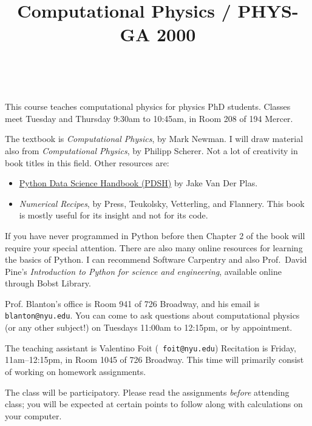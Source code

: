 \documentclass[11pt, preprint]{aastex}
\begin{document}
\title{\bf Computational Physics / PHYS-GA 2000}
~
~



\noindent This course teaches computational physics for physics PhD
students. Classes meet Tuesday and Thursday 9:30am to 10:45am, in Room
208 of 194 Mercer.

\noindent The textbook is {\it Computational Physics}, by Mark
Newman. I will draw material also from {\it Computational Physics}, by
Philipp Scherer. Not a lot of creativity in book titles in this
field. Other resources are:
\begin{itemize}
\item
  \href{https://jakevdp.github.io/PythonDataScienceHandbook/}{Python
    Data Science Handbook (PDSH)} by Jake Van Der Plas.
\item {\it Numerical Recipes}, by Press, Teukolsky, Vetterling, and
  Flannery. This book is mostly useful for its insight and not for its
  code.
\end{itemize}

\noindent If you have never programmed in Python before then Chapter 2
of the book will require your special attention. There are also many
online resources for learning the basics of Python. I can recommend
Software Carpentry and also Prof.~David Pine's {\it Introduction to
  Python for science and engineering}, available online through Bobst
Library.

\noindent Prof. Blanton's office is Room 941 of 726 Broadway, and his
email is {\tt blanton@nyu.edu}. You can come to ask questions about
computational physics (or any other subject!) on Tuesdays 11:00am to
12:15pm, or by appointment.

\noindent The teaching assistant is Valentino Foit ({\tt
  foit@nyu.edu}) Recitation is Friday, 11am--12:15pm, in Room 1045
of 726 Broadway. This time will primarily consist of working on
homework assignments.

\noindent The class will be participatory. Please read the assignments
          {\it before} attending class; you will be expected at
          certain points to follow along with calculations on your
          computer.
\end{document}
